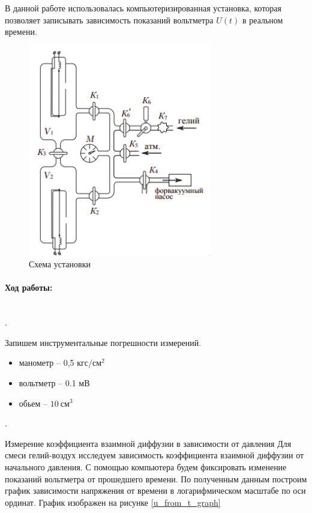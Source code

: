 \documentclass[a4paper, 12pt]{article}
\newcommand{\parag}[1]{\paragraph*{#1:}}
\newcounter{Points}
\newcommand{\point}{\arabic{Points}. \addtocounter{Points}{1}}
\begin{document}
В данной работе использовалась компьютеризированная установка, которая позволяет записывать зависимость показаний вольтметра $ U(t) $ в реальном времени.

\begin{figure}
    \centering
	\includegraphics[width=8cm]{setup.png}
	\caption{Схема установки}
	\label{setup}
\end{figure}

\parag {Ход работы} ~\\
\point Запишем инструментальные погрешности измерений.

\begin{itemize}
    \item манометр -- 0,5 $кгс/см^2$
    \item вольтметр -- 0.1 мВ
    \item обьем -- $10 \ см^3$
\end{itemize}

\point Измерение коэффициента взаимной диффузии в зависимости от давления
Для смеси гелий-воздух исследуем зависимость коэффициента взаимной диффузии от начального давления. С помощью компьютера будем фиксировать изменение показаний вольтметра от прошедшего времени. По полученным данным построим график зависимости напряжения от времени в логарифмическом масштабе по оси ординат. График изображен на рисунке \ref{u_from_t_graph}
\end{document}
